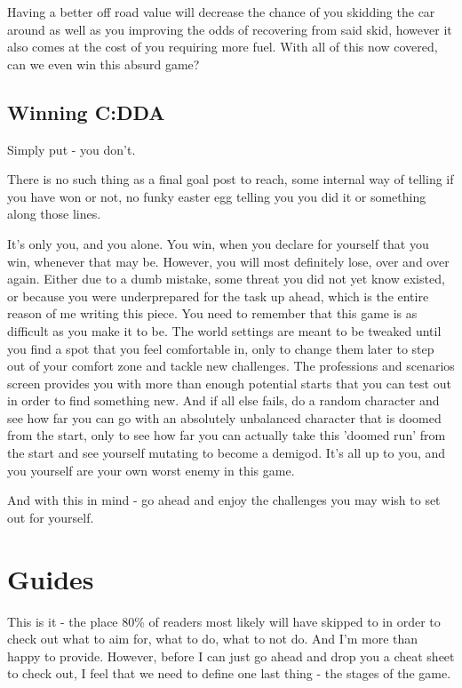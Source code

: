 \documentclass[11pt]{report}
\begin{document}
Having a better off road value will decrease the chance of you skidding the car around as well as you improving the odds of recovering from said skid, however it also comes at the cost of you requiring more fuel.
With all of this now covered, can we even win this absurd game?

\section{Winning C:DDA}

Simply put - you don't.

There is no such thing as a final goal post to reach, some internal way of telling if you have won or not, no funky easter egg telling you you did it or something along those lines.

It's only you, and you alone. You win, when you declare for yourself that you win, whenever that may be. However, you will most definitely lose, over and over again. Either due to a dumb mistake, some threat you did not yet know existed, or because you were underprepared for the task up ahead, which is the entire reason of me writing this piece. You need to remember that this game is as difficult as you make it to be. The world settings are meant to be tweaked until you find a spot that you feel comfortable in, only to change them later to step out of your comfort zone and tackle new challenges. The professions and scenarios screen provides you with more than enough potential starts that you can test out in order to find something new. And if all else fails, do a random character and see how far you can go with an absolutely unbalanced character that is doomed from the start, only to see how far you can actually take this 'doomed run' from the start and see yourself mutating to become a demigod. It's all up to you, and you yourself are your own worst enemy in this game.

And with this in mind - go ahead and enjoy the challenges you may wish to set out for yourself.

\chapter{Guides}

This is it - the place 80\% of readers most likely will have skipped to in order to check out what to aim for, what to do, what to not do. And I'm more than happy to provide. However, before I can just go ahead and drop you a cheat sheet to check out, I feel that we need to define one last thing - the stages of the game.
\end{document}
